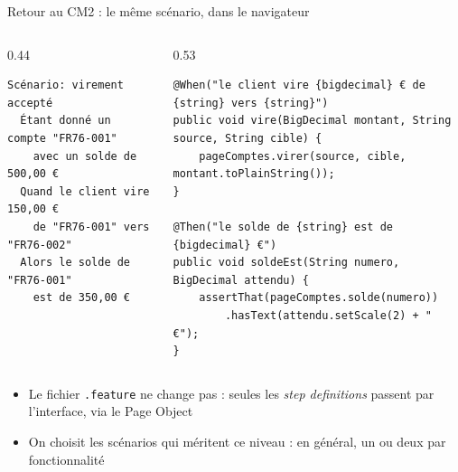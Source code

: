 \documentclass[aspectratio=169,10pt]{beamer}
\begin{document}
\begin{frame}[fragile]{Retour au CM2 : le même scénario, dans le navigateur}
  \begin{columns}[T]
    \begin{column}{0.44\textwidth}
\begin{lstlisting}[language={}, basicstyle=\lstcode\scriptsize]
Scénario: virement accepté
  Étant donné un compte "FR76-001"
    avec un solde de 500,00 €
  Quand le client vire 150,00 €
    de "FR76-001" vers "FR76-002"
  Alors le solde de "FR76-001"
    est de 350,00 €
\end{lstlisting}
    \end{column}
    \begin{column}{0.53\textwidth}
\begin{lstlisting}[basicstyle=\lstcode\scriptsize]
@When("le client vire {bigdecimal} € de {string} vers {string}")
public void vire(BigDecimal montant, String source, String cible) {
    pageComptes.virer(source, cible, montant.toPlainString());
}

@Then("le solde de {string} est de {bigdecimal} €")
public void soldeEst(String numero, BigDecimal attendu) {
    assertThat(pageComptes.solde(numero))
        .hasText(attendu.setScale(2) + " €");
}
\end{lstlisting}
    \end{column}
  \end{columns}
  \vspace{2mm}
  \small
  \begin{itemize}
    \item Le fichier \texttt{.feature} ne change pas : seules les \textit{step definitions} passent par l'interface, via le Page Object
    \item On choisit les scénarios qui méritent ce niveau : en général, un ou deux par fonctionnalité
  \end{itemize}
\end{frame}

\end{document}
